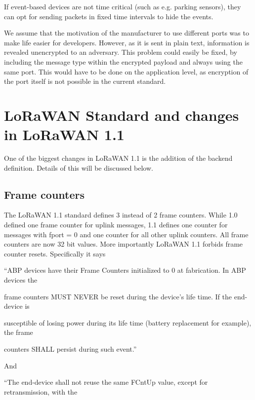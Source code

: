 {If event-based devices are not time critical (such as e.g. parking
sensors), they can opt for sending packets in fixed time intervals to
hide the events.}

{We assume that the motivation of the manufacturer to use different
ports was to make life easier for developers. However, as it is sent in
plain text, information is revealed unencrypted to an adversary. This
problem could easily be fixed, by including the message type within the
encrypted payload and always using the same port. This would have to be
done on the application level, as encryption of the port itself is not
possible in the current standard.}

\hypertarget{h.6snn4dp8j73u}{\section{\texorpdfstring{{LoRaWAN Standard
and changes in LoRaWAN
1.1}}{LoRaWAN Standard and changes in LoRaWAN 1.1}}\label{h.6snn4dp8j73u}}

{One of the biggest changes in LoRaWAN 1.1 is the addition of the
backend definition. Details of this will be discussed below.}

\hypertarget{h.jpbc1i7c9eqd}{\subsection{\texorpdfstring{{Frame
counters}}{Frame counters}}\label{h.jpbc1i7c9eqd}}

{The LoRaWAN 1.1 standard defines 3 instead of 2 frame counters. While
1.0 defined one frame counter for uplink messages, 1.1 defines one
counter for messages with fport = 0 and one counter for all other uplink
counters. All frame counters are now 32 bit values. More importantly
}{LoRaWAN 1.1 forbids frame counter resets}{. Specifically it says}

{``ABP devices have their Frame Counters initialized to 0 at
fabrication. In ABP devices the}

{frame counters MUST NEVER be reset during the device's life time. If
the end-device is}

{susceptible of losing power during its life time (battery replacement
for example), the frame}

{counters SHALL persist during such event.''}

{And}

{``The end-device shall not reuse the same FCntUp value, except for
retransmission, with the}

